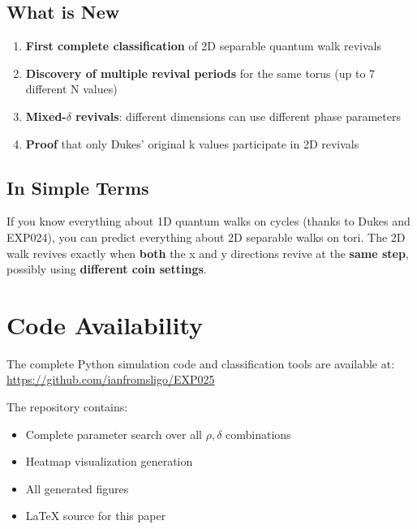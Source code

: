 \documentclass[12pt]{article}
\begin{document}
\subsection*{What is New}

\begin{enumerate}
    \item \textbf{First complete classification} of 2D separable quantum walk revivals
    \item \textbf{Discovery of multiple revival periods} for the same torus (up to 7 different N values)
    \item \textbf{Mixed-\(\delta\) revivals}: different dimensions can use different phase parameters
    \item \textbf{Proof} that only Dukes' original k values participate in 2D revivals
\end{enumerate}

\subsection*{In Simple Terms}

If you know everything about 1D quantum walks on cycles (thanks to Dukes and EXP024), you can predict everything about 2D separable walks on tori. The 2D walk revives exactly when \textbf{both} the x and y directions revive at the \textbf{same step}, possibly using \textbf{different coin settings}.

\section*{Code Availability}

The complete Python simulation code and classification tools are available at:
\url{https://github.com/ianfromsligo/EXP025}

The repository contains:
\begin{itemize}
    \item Complete parameter search over all \(\rho, \delta\) combinations
    \item Heatmap visualization generation
    \item All generated figures
    \item LaTeX source for this paper
\end{itemize}
\end{document}
